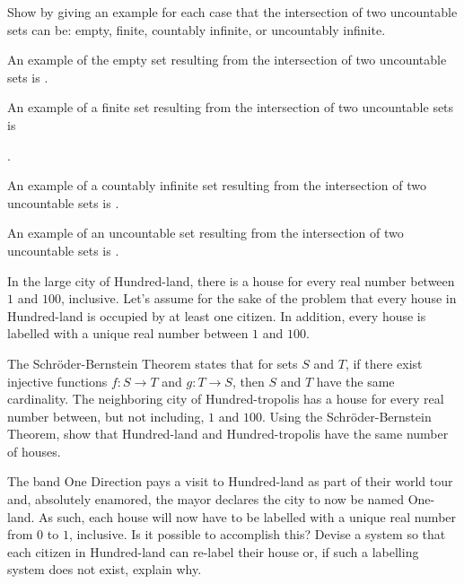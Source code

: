 \documentclass[solution, letterpaper]{cs20}
\begin{document}

Show by giving an example for each case that the intersection of two uncountable sets can be: empty, finite, countably
infinite, or uncountably infinite.

\begin{solution}
An example of the empty set resulting from the intersection of two uncountable sets is \fbox{$\big[0,1\big] \cap \big[2,3\big] = \emptyset$}.
\newline

\noindent An example of a finite set resulting from the intersection of two uncountable sets is 

\noindent {}.
\newline

\noindent An example of a countably infinite set resulting from the intersection of two uncountable sets is .
\newline

\noindent An example of an uncountable set resulting from the intersection of two uncountable sets is .
\end{solution}

In the large city of Hundred-land, there is a house for every real number between $1$ and $100$, inclusive. Let's assume for the sake of the problem that every house in Hundred-land is occupied by at least one citizen. In addition, every house is labelled with a unique real number between $1$ and $100$.

\subproblem The Schr\"{o}der-Bernstein Theorem states that for sets $S$ and $T$, if there exist injective functions $f : S \rightarrow T$ and $g : T \rightarrow S$, then $S$ and $T$ have the same cardinality. The neighboring city of Hundred-tropolis has a house for every real number between, but not including, $1$ and $100$. Using the Schr\"{o}der-Bernstein Theorem, show that Hundred-land and Hundred-tropolis have the same number of houses.

\subproblem The band One Direction pays a visit to Hundred-land as part of their world tour and, absolutely enamored, the mayor declares the city to now be named One-land. As such, each house will now have to be labelled with a unique real number from $0$ to $1$, inclusive. Is it possible to accomplish this? Devise a system so that each citizen in Hundred-land can re-label their house or, if such a labelling system does not exist, explain why.
\end{document}
